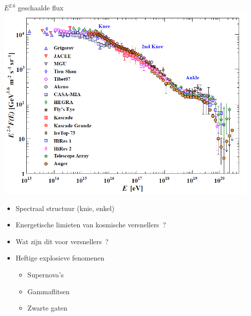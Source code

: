 \Tr
\vspace*{1.5cm}
\begin{center}
{\blue $E^{2.6}$ geschaalde flux}\\[5mm]
\includegraphics[keepaspectratio,width=13cm]{cr-all-scaled26}
\end{center}

\newpage

\vspace*{3cm}
\begin{itemize}
\item Spectraal structuur (knie, enkel)
\item[] Energetische limieten van kosmische versnellers~?
\item Wat zijn dit voor versnellers~?
\item[] Heftige explosieve fenomenen
\begin{itemize}
\item Supernova's
\item Gammaflitsen
\item Zwarte gaten
\end{itemize}
\end{itemize}

